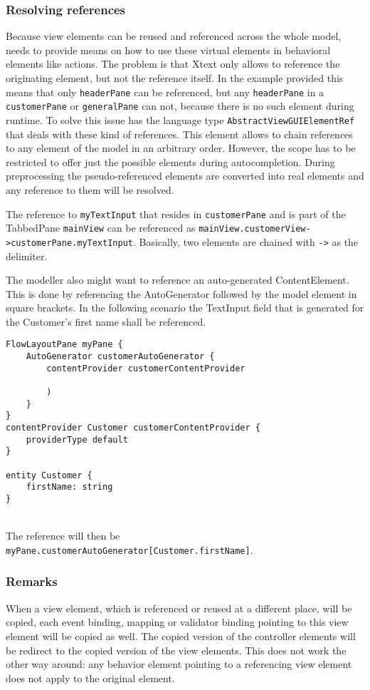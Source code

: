 \subsubsection{Resolving references}
Because view elements can be reused and referenced across the whole model, \MD needs to provide means on how to use these virtual elements in behavioral elements like actions. The problem is that Xtext only allows to reference the originating element, but not the reference itself. In the example provided this means that only \lstinline!headerPane! can be referenced, but any \lstinline!headerPane! in a \lstinline!customerPane! or \lstinline!generalPane! can not, because there is no such element during runtime. To solve this issue \MD has the language type \lstinline!AbstractViewGUIElementRef! that deals with these kind of references. This element allows to chain references to any element of the model in an arbitrary order. However, the scope has to be restricted to offer just the possible elements during autocompletion. During preprocessing the pseudo-referenced elements are converted into real elements and any reference to them will be resolved.

The reference to \lstinline!myTextInput! that resides in \lstinline!customerPane! and is part of the TabbedPane \lstinline!mainView! can be referenced as \lstinline!mainView.customerView->customerPane.myTextInput!. Basically, two elements are chained with \lstinline!->! as the delimiter.

The modeller also might want to reference an auto-generated ContentElement. This is done by referencing the AutoGenerator followed by the model element in square brackets. In the following scenario the TextInput field that is generated for the Customer’s first name shall be referenced.

\begin{lstlisting}[language=MD2]
FlowLayoutPane myPane {
	AutoGenerator customerAutoGenerator {
		contentProvider customerContentProvider
		
		)
	}
}
contentProvider Customer customerContentProvider {
	providerType default
}

entity Customer {
	firstName: string
}
\end{lstlisting}
~
\\
The reference will then be \lstinline!myPane.customerAutoGenerator[Customer.firstName]!.

\subsubsection{Remarks}
When a view element, which is referenced or reused at a different place, will be copied, each event binding, mapping or validator binding pointing to this view element will be copied as well. The copied version of the controller elements will be redirect to the copied version of the view elements. This does not work the other way around: any behavior element pointing to a referencing view element does not apply to the original element.

